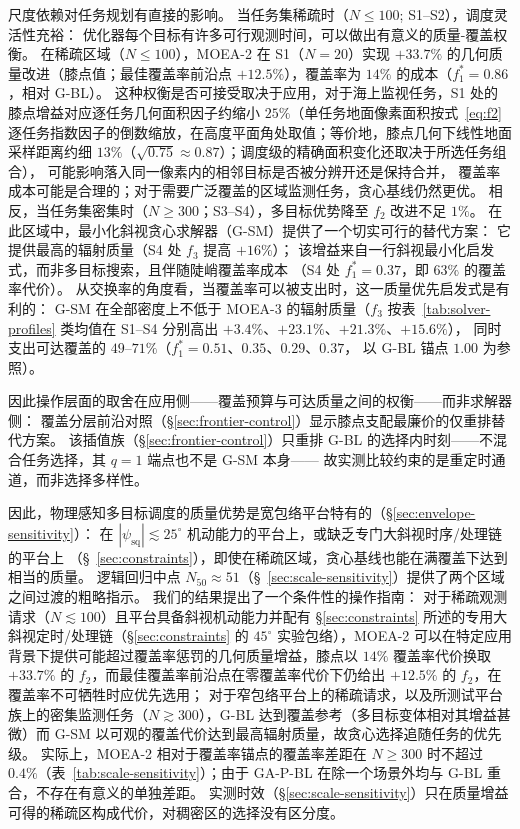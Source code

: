 \documentclass[preprint,12pt,authoryear]{elsarticle}
\begin{document}
尺度依赖对任务规划有直接的影响。
当任务集稀疏时（$N \leq 100$; S1--S2），调度灵活性充裕：
优化器每个目标有许多可行观测时间，可以做出有意义的质量-覆盖权衡。
在稀疏区域（$N \leq 100$），MOEA-2 在 S1（$N = 20$）实现 $+33.7\%$ 的几何质量改进（膝点值；最佳覆盖率前沿点 $+12.5\%$），覆盖率为 $14\%$ 的成本（$f_1^* = 0.86$，相对 G-BL）。
这种权衡是否可接受取决于应用，对于海上监视任务，S1 处的膝点增益对应逐任务几何面积因子约缩小 $25\%$（单任务地面像素面积按式~\ref{eq:f2} 逐任务指数因子的倒数缩放，在高度平面角处取值；等价地，膝点几何下线性地面采样距离约细 $13\%$（$\sqrt{0.75} \approx 0.87$）；调度级的精确面积变化还取决于所选任务组合），
可能影响落入同一像素内的相邻目标是否被分辨开还是保持合并，
覆盖率成本可能是合理的；对于需要广泛覆盖的区域监测任务，贪心基线仍然更优。
相反，当任务集密集时（$N \geq 300$；S3--S4），多目标优势降至 $f_2$ 改进不足 $1\%$。
在此区域中，最小化斜视贪心求解器（G-SM）提供了一个切实可行的替代方案：
它提供最高的辐射质量（S4 处 $f_3$ 提高 $+16\%$）；
该增益来自一行斜视最小化启发式，而非多目标搜索，且伴随陡峭覆盖率成本
（S4 处 $f_1^* = 0.37$，即 $63\%$ 的覆盖率代价）。
从交换率的角度看，当覆盖率可以被支出时，这一质量优先启发式是有利的：
G-SM 在全部密度上不低于 MOEA-3 的辐射质量（$f_3$ 按表~\ref{tab:solver-profiles}
类均值在 S1--S4 分别高出 $+3.4\%$、$+23.1\%$、$+21.3\%$、$+15.6\%$），
同时支出可达覆盖的 $49$--$71\%$（$f_1^* = 0.51$、$0.35$、$0.29$、$0.37$，
以 G-BL 锚点 $1.00$ 为参照）。

因此操作层面的取舍在应用侧——覆盖预算与可达质量之间的权衡——而非求解器侧：
覆盖分层前沿对照（\S\ref{sec:frontier-control}）显示膝点支配最廉价的仅重排替代方案。
该插值族（\S\ref{sec:frontier-control}）只重排 G-BL 的选择内时刻——不混合任务选择，其 $q=1$ 端点也不是 G-SM 本身——
故实测比较约束的是重定时通道，而非选择多样性。

因此，物理感知多目标调度的质量优势是宽包络平台特有的（\S\ref{sec:envelope-sensitivity}）：
在 $|\psi_{\text{sq}}| \lesssim 25^\circ$ 机动能力的平台上，或缺乏专门大斜视时序/处理链的平台上
（\S~\ref{sec:constraints}），即使在稀疏区域，贪心基线也能在满覆盖下达到相当的质量。
逻辑回归中点 $N_{50} \approx 51$（\S~\ref{sec:scale-sensitivity}）提供了两个区域之间过渡的粗略指示。
我们的结果提出了一个条件性的操作指南：
对于稀疏观测请求（$N \lesssim 100$）且平台具备斜视机动能力并配有 \S\ref{sec:constraints} 所述的专用大斜视定时/处理链（\S\ref{sec:constraints} 的 $45^\circ$ 实验包络），MOEA-2 可以在特定应用背景下提供可能超过覆盖率惩罚的几何质量增益，膝点以 $14\%$ 覆盖率代价换取 $+33.7\%$ 的 $f_2$，而最佳覆盖率前沿点在零覆盖率代价下仍给出 $+12.5\%$ 的 $f_2$，在覆盖率不可牺牲时应优先选用；
对于窄包络平台上的稀疏请求，以及所测试平台族上的密集监测任务（$N \gtrsim 300$），G-BL 达到覆盖参考（多目标变体相对其增益甚微）而 G-SM 以可观的覆盖代价达到最高辐射质量，故贪心选择追随任务的优先级。
实际上，MOEA-2 相对于覆盖率锚点的覆盖率差距在 $N \geq 300$ 时不超过 $0.4\%$（表~\ref{tab:scale-sensitivity}）；由于 GA-P-BL 在除一个场景外均与 G-BL 重合，不存在有意义的单独差距。
实测时效（\S\ref{sec:scale-sensitivity}）只在质量增益可得的稀疏区构成代价，对稠密区的选择没有区分度。
\end{document}
